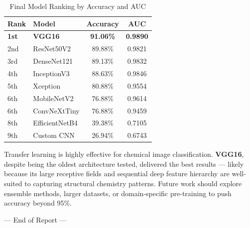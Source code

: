 \documentclass[12pt,a4paper]{article}
\begin{document}
\begin{table}[H]
\centering
\caption{Final Model Ranking by Accuracy and AUC}
\label{tab:final_ranking_summary}
\begin{tabular}{l l c c}
  \toprule
  \textbf{Rank} & \textbf{Model} & \textbf{Accuracy} & \textbf{AUC} \\
  \midrule
  \rowcolor{green!12} \textbf{1st} & \textbf{VGG16}    & \textbf{91.06\%} & \textbf{0.9890} \\
  2nd & ResNet50V2     & 89.88\% & 0.9821 \\
  3rd & DenseNet121    & 89.13\% & 0.9832 \\
  4th & InceptionV3    & 88.63\% & 0.9846 \\
  5th & Xception       & 80.88\% & 0.9554 \\
  6th & MobileNetV2    & 76.88\% & 0.9614 \\
  6th & ConvNeXtTiny   & 76.88\% & 0.9459 \\
  8th & EfficientNetB4 & 39.38\% & 0.7105 \\
  9th & Custom CNN     & 26.94\% & 0.6743 \\
  \bottomrule
\end{tabular}
\end{table}

\begin{insightbox}
Transfer learning is highly effective for chemical image classification. \textbf{VGG16}, despite being the oldest architecture tested, delivered the best results --- likely because its large receptive fields and sequential deep feature hierarchy are well-suited to capturing structural chemistry patterns. Future work should explore ensemble methods, larger datasets, or domain-specific pre-training to push accuracy beyond 95\%.
\end{insightbox}

\vspace{2em}
\begin{center}
  \color{DarkGray}\sffamily\small --- End of Report ---
\end{center}
\end{document}
